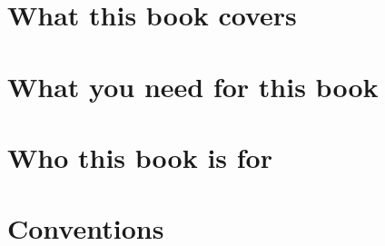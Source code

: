 \section{What this book covers}

\section{What you need for this book}

\section{Who this book is for}

\section{Conventions}